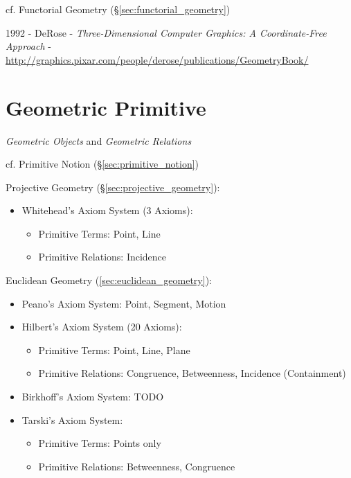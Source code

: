 \fist cf. Functorial Geometry (\S\ref{sec:functorial_geometry})

1992 - DeRose - \emph{Three-Dimensional Computer Graphics: A Coordinate-Free
  Approach} -
\url{http://graphics.pixar.com/people/derose/publications/GeometryBook/}



\section{Geometric Primitive}\label{sec:geometric_primitive}

\emph{Geometric Objects} and \emph{Geometric Relations}

cf. Primitive Notion (\S\ref{sec:primitive_notion})

Projective Geometry (\S\ref{sec:projective_geometry}):
\begin{itemize}
  \item Whitehead's Axiom System (3 Axioms):
    \begin{itemize}
      \item Primitive Terms: Point, Line
      \item Primitive Relations: Incidence
    \end{itemize}
\end{itemize}

Euclidean Geometry (\ref{sec:euclidean_geometry}):
\begin{itemize}
  \item Peano's Axiom System: Point, Segment, Motion
  \item Hilbert's Axiom System (20 Axioms):
    \begin{itemize}
      \item Primitive Terms: Point, Line, Plane
      \item Primitive Relations: Congruence, Betweenness,
        Incidence (Containment)
    \end{itemize}
  \item Birkhoff's Axiom System: TODO
  \item Tarski's Axiom System:
    \begin{itemize}
      \item Primitive Terms: Points only
      \item Primitive Relations: Betweenness, Congruence
    \end{itemize}
\end{itemize}



